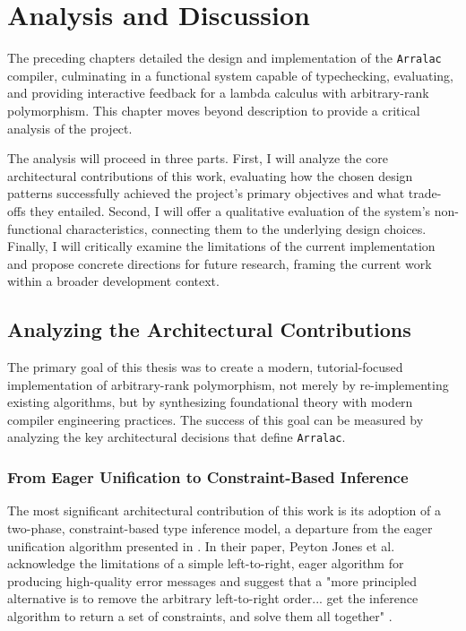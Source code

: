 \chapter{Analysis and Discussion}
\label{chap:AnalysisAndDiscussion}

The preceding chapters detailed the design and implementation of the \texttt{Arralac} compiler, culminating in a functional system capable of typechecking, evaluating, and providing interactive feedback for a lambda calculus with arbitrary-rank polymorphism. This chapter moves beyond description to provide a critical analysis of the project.

The analysis will proceed in three parts. First, I will analyze the core architectural contributions of this work, evaluating how the chosen design patterns successfully achieved the project's primary objectives and what trade-offs they entailed. Second, I will offer a qualitative evaluation of the system's non-functional characteristics, connecting them to the underlying design choices. Finally, I will critically examine the limitations of the current implementation and propose concrete directions for future research, framing the current work within a broader development context.

\section{Analyzing the Architectural Contributions}
\label{sec:Discussion:Objectives}

The primary goal of this thesis was to create a modern, tutorial-focused implementation of arbitrary-rank polymorphism, not merely by re-implementing existing algorithms, but by synthesizing foundational theory with modern compiler engineering practices. The success of this goal can be measured by analyzing the key architectural decisions that define \texttt{Arralac}.

\subsection{From Eager Unification to Constraint-Based Inference}
The most significant architectural contribution of this work is its adoption of a two-phase, constraint-based type inference model, a departure from the eager unification algorithm presented in \cite{jones-practical-2007}. In their paper, Peyton Jones et al. acknowledge the limitations of a simple left-to-right, eager algorithm for producing high-quality error messages and suggest that a "more principled alternative is to remove the arbitrary left-to-right order... get the inference algorithm to return a set of constraints, and solve them all together" \cite[Sec. 9.6]{jones-practical-2007}.


